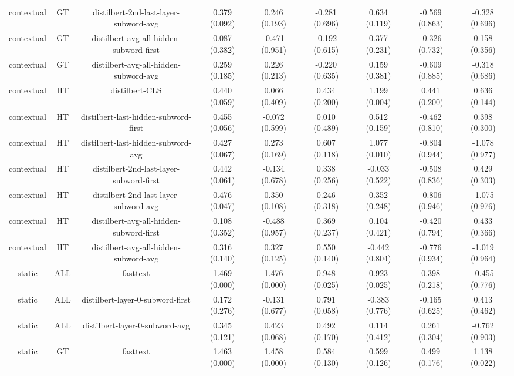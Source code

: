 \begin{sidewaystable}[htb]
\begin{tabular}{@{}ccccccccc@{}}
        contextual & GT & distilbert-2nd-last-layer-subword-avg & 0.379 (0.092) & 0.246 (0.193) & -0.281 (0.696) & 0.634 (0.119) & -0.569 (0.863) & -0.328 (0.696) \\
        contextual & GT & distilbert-avg-all-hidden-subword-first & 0.087 (0.382) & -0.471 (0.951) & -0.192 (0.615) & 0.377 (0.231) & -0.326 (0.732) & 0.158 (0.356) \\
        contextual & GT & distilbert-avg-all-hidden-subword-avg & 0.259 (0.185) & 0.226 (0.213) & -0.220 (0.635) & 0.159 (0.381) & -0.609 (0.885) & -0.318 (0.686) \\
        contextual & HT & distilbert-CLS & 0.440 (0.059) & 0.066 (0.409) & 0.434 (0.200) & 1.199 (0.004) & 0.441 (0.200) & 0.636 (0.144) \\
        contextual & HT & distilbert-last-hidden-subword-first & 0.455 (0.056) & -0.072 (0.599) & 0.010 (0.489) & 0.512 (0.159) & -0.462 (0.810) & 0.398 (0.300) \\
        contextual & HT & distilbert-last-hidden-subword-avg & 0.427 (0.067) & 0.273 (0.169) & 0.607 (0.118) & 1.077 (0.010) & -0.804 (0.944) & -1.078 (0.977) \\
        contextual & HT & distilbert-2nd-last-layer-subword-first & 0.442 (0.061) & -0.134 (0.678) & 0.338 (0.256) & -0.033 (0.522) & -0.508 (0.836) & 0.429 (0.303) \\
        contextual & HT & distilbert-2nd-last-layer-subword-avg & 0.476 (0.047) & 0.350 (0.108) & 0.246 (0.318) & 0.352 (0.248) & -0.806 (0.946) & -1.075 (0.976) \\
        contextual & HT & distilbert-avg-all-hidden-subword-first & 0.108 (0.352) & -0.488 (0.957) & 0.369 (0.237) & 0.104 (0.421) & -0.420 (0.794) & 0.433 (0.366) \\
        contextual & HT & distilbert-avg-all-hidden-subword-avg & 0.316 (0.140) & 0.327 (0.125) & 0.550 (0.140) & -0.442 (0.804) & -0.776 (0.934) & -1.019 (0.964) \\
        static & ALL & fasttext & 1.469 (0.000) & 1.476 (0.000) & 0.948 (0.025) & 0.923 (0.025) & 0.398 (0.218) & -0.455 (0.776) \\
        static & ALL & distilbert-layer-0-subword-first & 0.172 (0.276) & -0.131 (0.677) & 0.791 (0.058) & -0.383 (0.776) & -0.165 (0.625) & 0.413 (0.462) \\
        static & ALL & distilbert-layer-0-subword-avg & 0.345 (0.121) & 0.423 (0.068) & 0.492 (0.170) & 0.114 (0.412) & 0.261 (0.304) & -0.762 (0.903) \\
        static & GT & fasttext & 1.463 (0.000) & 1.458 (0.000) & 0.584 (0.130) & 0.599 (0.126) & 0.499 (0.176) & 1.138 (0.022) \\

\end{tabular}
\end{sidewaystable}
